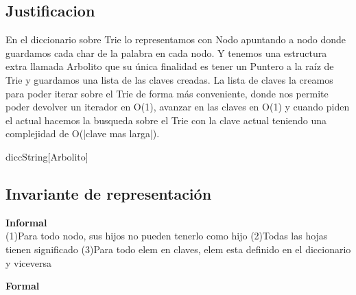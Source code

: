 \begin{Representacion}


\subsection{Justificacion}
En el diccionario sobre Trie lo representamos con Nodo apuntando a nodo donde guardamos cada char de la palabra en cada nodo. Y tenemos una estructura extra llamada Arbolito que su única finalidad es tener un Puntero a la ra\'iz de Trie y guardamos una lista de las claves creadas. La lista de claves la creamos para poder iterar sobre el Trie de forma m\'as conveniente, donde nos permite poder devolver un iterador en O(1), avanzar en las claves en O(1) y cuando piden el actual hacemos la busqueda sobre el Trie con la clave actual teniendo una complejidad de O(|clave mas larga|).
	
	\begin{Estructura}{diccString}[Arbolito]
		\begin{Tupla}[Arbolito]
		\end{Tupla}
		\begin{Tupla}[nodo]
		\end{Tupla}
	\end{Estructura}

\subsection{Invariante de representación}

\textbf{Informal}\\
(1)Para todo nodo, sus hijos no pueden tenerlo como hijo
(2)Todas las hojas tienen significado
(3)Para todo elem en claves, elem esta definido en el diccionario y viceversa

\textbf{Formal}\\







\end{Representacion}
